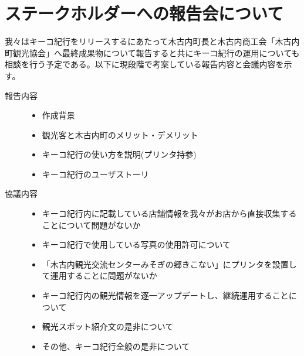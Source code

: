 \section{ステークホルダーへの報告会について}
我々はキーコ紀行をリリースするにあたって木古内町長と木古内商工会「木古内町観光協会」へ最終成果物について報告すると共にキーコ紀行の運用についても相談を行う予定である。以下に現段階で考案している報告内容と会議内容を示す。
\begin{description}
 \item[報告内容]\mbox{}
 	\begin{itemize}
	\item 作成背景
	\item 観光客と木古内町のメリット・デメリット
	\item キーコ紀行の使い方を説明(プリンタ持参)
	\item キーコ紀行のユーザストーリ \\
	\end{itemize}
 \item[協議内容]\mbox{}
	\begin{itemize}
	\item キーコ紀行内に記載している店舗情報を我々がお店から直接収集することについて問題がないか
	\item キーコ紀行で使用している写真の使用許可について
	\item 「木古内観光交流センターみそぎの郷きこない」にプリンタを設置して運用することに問題がないか
	\item キーコ紀行内の観光情報を逐一アップデートし、継続運用することについて
	\item 観光スポット紹介文の是非について
	\item その他、キーコ紀行全般の是非について
	\end{itemize}
\end{description}


